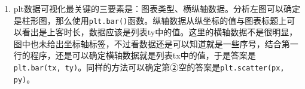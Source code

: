 \begin{enumerate}
\begin{enumerate}[label=$(\arabic*)$]
\setcounter{qnumber}{1}
\begin{lstlisting}[numbers=left]
tx = range(count)
plt.figure(1)
plt.title("当日上客时长对比图(单位:秒)")
`\clozeblank{2}`   # 绘制图表分析当日搭载乘客的上客时长
plt.figure(2)
plt.title("当日上客地点分布图")
`\clozeblank{2}`   # 绘制图表分析当日搭载乘客的上客地点分布
plt.show()
\end{lstlisting}
	\item plt数据可视化最关键的三要素是：图表类型、横纵轴数据。分析左图可以确定是柱形图，那么使用\lstinline|plt.bar()|函数。纵轴数据从纵坐标的值与图表标题上可以看出是上客时长，数据应该是列表ty中的值。这里的横轴数据不是很明显，图中也未给出坐标轴标签，不过看数据还是可以知道就是一些序号，结合第一行的程序，还是可以确定横轴数据就是列表tx中的值，于是答案是\lstinline|plt.bar(tx, ty)|。同样的方法可以确定第②空的答案是\lstinline|plt.scatter(px, py)|。
	\end{enumerate}











\end{enumerate}


\newpage
